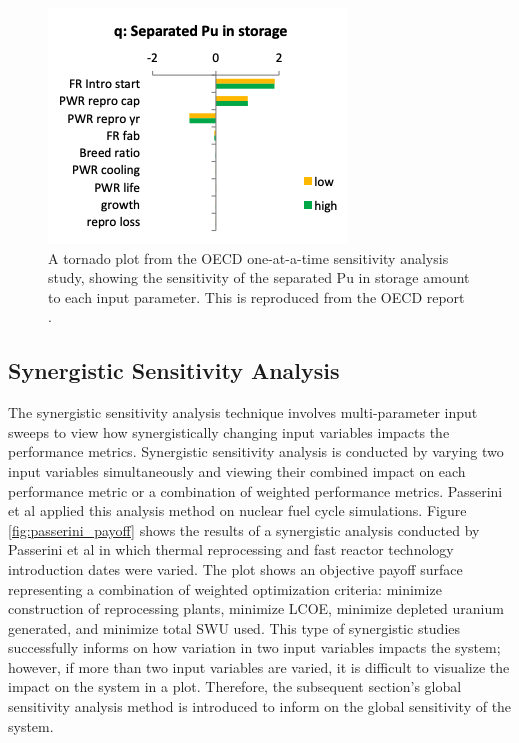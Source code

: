 \begin{figure}[]
	\begin{center}
		\includegraphics[scale=1]{./figures/oecd-tornado.png}
	\end{center}	
		\caption{A tornado plot from the OECD one-at-a-time sensitivity analysis 
        study, showing the sensitivity of the separated Pu in 
        storage amount to each input parameter. This is 
        reproduced from the OECD report \cite{noauthor_effects_2017}.}
	\label{fig:oecd-tornado}
\end{figure}

\subsection{Synergistic Sensitivity Analysis}
\label{sec:syn}
The synergistic sensitivity analysis technique involves multi-parameter 
input sweeps to view how synergistically changing input variables 
impacts the performance metrics.  
Synergistic sensitivity analysis is conducted by varying 
two input variables simultaneously and viewing their 
combined impact on each performance metric or a combination 
of weighted performance metrics. 
Passerini et al \cite{passerini_systematic_2014} applied
this analysis method on nuclear fuel cycle simulations. 
Figure \ref{fig:passerini_payoff} shows the results of a synergistic analysis 
conducted by Passerini et al \cite{passerini_systematic_2014} 
in which thermal reprocessing and fast reactor technology 
introduction dates were varied. 
The plot shows an objective payoff surface representing a combination of 
weighted optimization criteria: minimize construction of reprocessing plants, 
minimize \gls{LCOE}, minimize depleted uranium generated, and minimize total SWU used.
This type of synergistic studies successfully informs on how variation in 
two input variables impacts the system; however, if more than two input variables 
are varied, it is difficult to visualize the impact on the system in a plot. 
Therefore, the subsequent section's global sensitivity analysis method is introduced to 
inform on the global sensitivity of the system. 

